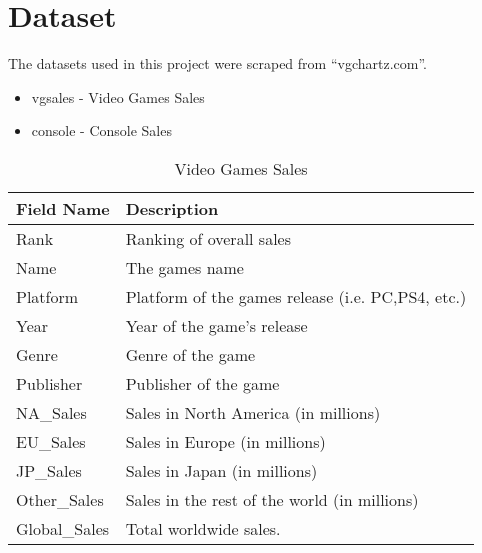 \documentclass[conference]{IEEEtran}
\begin{document}
\section{Dataset}
The datasets used in this project were scraped from ``vgchartz.com''.
\begin{itemize}
    \item vgsales - Video Games Sales
    \item console - Console Sales
\end{itemize}
\begin{table}[htbp]
    \caption{Video Games Sales}
    \begin{tabular}{ll}
        \hline
        \multicolumn{1}{c}{Field Name} & Description                                       \\ \hline
        Rank                           & Ranking of overall sales                          \\
        Name                           & The games name                                    \\
        Platform                       & Platform of the games release (i.e. PC,PS4, etc.) \\
        Year                           & Year of the game's release                        \\
        Genre                          & Genre of the game                                 \\
        Publisher                      & Publisher of the game                             \\
        NA\_Sales                      & Sales in North America (in millions)              \\
        EU\_Sales                      & Sales in Europe (in millions)                     \\
        JP\_Sales                      & Sales in Japan (in millions)                      \\
        Other\_Sales                   & Sales in the rest of the world (in millions)      \\
        Global\_Sales                  & Total worldwide sales.                            \\ \hline
    \end{tabular}
\end{table}
\end{document}
